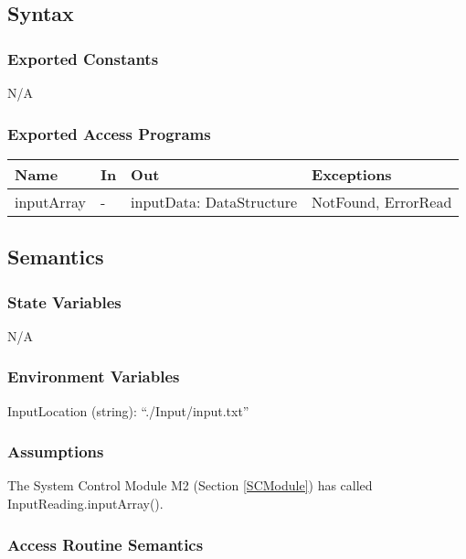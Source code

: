 \documentclass[12pt, titlepage]{article}
\begin{document}
\subsection{Syntax}

\subsubsection{Exported Constants}
N/A

\subsubsection{Exported Access Programs}

\begin{center}
	\begin{tabular}{p{2cm} p{4cm} p{3cm} p{2cm}}
		\hline
		\textbf{Name} & \textbf{In} & \textbf{Out} & \textbf{Exceptions} \\
		\hline
		inputArray & - & inputData: DataStructure & NotFound, ErrorRead \\
		\hline
	\end{tabular}
\end{center}

\subsection{Semantics}

\subsubsection{State Variables}
N/A

\subsubsection{Environment Variables}

InputLocation (string): ``./Input/input.txt'' 

\subsubsection{Assumptions}

The System Control Module M2 (Section \ref{SCModule}) has called InputReading.inputArray().

\subsubsection{Access Routine Semantics}
\end{document}
